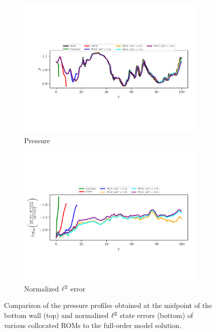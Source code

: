 \begin{figure}
\begin{center}

\begin{subfigure}[t]{0.95\textwidth}
\includegraphics[trim={0cm 2.5cm 0cm 2.5cm},clip,width=1.\linewidth]{figs/cavity/pressure.pdf}
\caption{Pressure} 
\label{fig:cav_results1a_basis1}
\end{subfigure}

\begin{subfigure}[t]{1.0\textwidth}
\includegraphics[trim={0cm 2.5cm 0cm 3cm},clip,width=1.\linewidth]{figs/cavity/error.pdf}
\caption{Normalized $\ell^2$ error}
\label{fig:cav_results1b_basis1}
\end{subfigure}
\end{center}
\caption{Comparison of the pressure profiles obtained at the midpoint of the bottom wall (top) and normalized $\ell^2$ state errors (bottom) of various collocated ROMs to the full-order model solution.}
\label{fig:cav_results1_basis1}
\end{figure}


